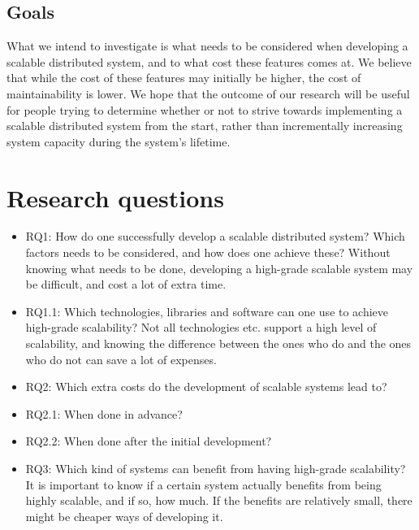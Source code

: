 \documentclass{article}
\begin{document}
{\subsection{Goals} 

What we intend to investigate is what needs to be considered
when developing a scalable distributed system, and to what cost these features
comes at. We believe that while the cost of these features may initially be
higher, the cost of maintainability is lower. We hope that the outcome of our
research will be useful for people trying to determine whether or not to strive
towards implementing a scalable distributed system from the start, rather than
incrementally increasing system capacity during the system's lifetime.

\newpage

\section{Research questions}

\begin{itemize}
\item{RQ1: How do one successfully develop a scalable distributed system? Which
factors needs to be considered, and how does one achieve these? Without knowing
what needs to be done, developing a high-grade scalable system may be
difficult, and cost a lot of extra time.} 

\item{RQ1.1: Which technologies, libraries and software can one use to achieve
high-grade scalability? Not all technologies etc. support a high level of
scalability, and knowing the difference between the ones who do and the ones
who do not can save a lot of expenses.}

\item{RQ2: Which extra costs do the development of scalable systems lead to?} 
\item{RQ2.1: When done in advance?} 
\item{RQ2.2: When done after the initial development?} 

\item{RQ3: Which kind of systems can benefit from having high-grade scalability?
It is important to know if a certain system actually benefits from being highly
scalable, and if so, how much. If the benefits are relatively small, there 
might be cheaper ways of developing it.}


\end{itemize}

}
\end{document}
